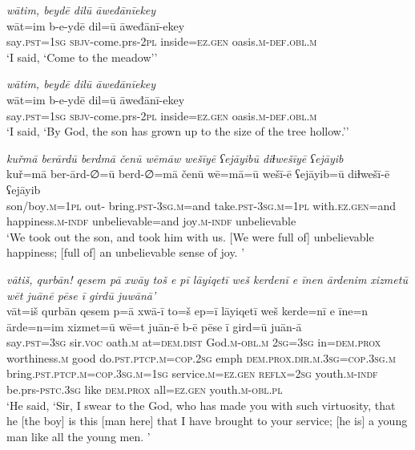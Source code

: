 \ea \label{ZQ.48}
\textit{wātim, beydē dilū āweđānīekey} \\ 
\gll wāt=im b-e-ydē dil=ū āweđānī-ekey \\ 
 say\textsc{.pst}\textsc{=\textsc{1sg}} \textsc{sbjv-}come.prs-\textsc{2pl} inside\textsc{=ez.gen} oasis\textsc{.m}\textsc{-def}\textsc{.obl}\textsc{.m} \\ 
\glt `I said, ‘Come to the meadow’'
\z 
 
\ea \label{ZQ.50}
\textit{wātim, beydē dilū āweđānīekey} \\ 
\gll wāt=im b-e-ydē dil=ū āweđānī-ekey \\ 
 say\textsc{.pst}\textsc{=\textsc{1sg}} \textsc{sbjv-}come.prs-\textsc{2pl} inside\textsc{=ez.gen} oasis\textsc{.m}\textsc{-def}\textsc{.obl}\textsc{.m} \\ 
\glt `I said, ‘By God, the son has grown up to the size of the tree hollow.’'
\z 
 
\ea \label{ZQ.53}
\textit{kuřmā berārdū berdmā čenū wēmāw wešīyē ʕejāyibū diɫwešīyē ʕejāyib} \\ 
\gll kuř=mā ber-ārd-∅=ū berd-∅=mā čenū wē=mā=ū wešī-ē ʕejāyib=ū diɫwešī-ē ʕejāyib \\ 
 son/boy\textsc{.m}\textsc{=\textsc{1pl}} out- bring\textsc{.pst}\textsc{-3sg}\textsc{.m}=and take\textsc{.pst}\textsc{-3sg}\textsc{.m}\textsc{=\textsc{1pl}} with\textsc{.ez.gen}=and happiness\textsc{.m}\textsc{-indf} unbelievable=and joy\textsc{.m}\textsc{-indf} unbelievable \\ 
\glt `We took out the son, and took him with us. [We were full of] unbelievable happiness; [full of] an unbelievable sense of joy. '
\z 
 
\ea \label{ZQ.54}
\textit{vātiš, qurbān! qesem pā xwāy toš e pī lāyiqetī weš kerdenī e īnen ārdenim xizmetū wēt juānē pēse ī girdū juwānā’} \\ 
\gll vāt=iš qurbān qesem p=ā xwā-ī to=š ep=ī lāyiqetī weš kerde=nī e īne=n ārde=n=im xizmet=ū wē=t juān-ē b-ē pēse ī gird=ū juān-ā \\ 
 say\textsc{.pst}\textsc{=3sg} sir.\textsc{voc} oath\textsc{.m} at=\textsc{dem.dist} God\textsc{.m}\textsc{-obl}\textsc{.m} \textsc{2sg}\textsc{=3sg} in=\textsc{dem.prox} worthiness\textsc{.m} good do\textsc{.pst}\textsc{.ptcp}\textsc{.m}\textsc{=cop}\textsc{.\textsc{2sg}} emph \textsc{dem.prox}\textsc{.dir}\textsc{.m}\textsc{.3sg}\textsc{=cop}\textsc{.3sg}\textsc{.m} bring\textsc{.pst}\textsc{.ptcp}\textsc{.m}\textsc{=cop}\textsc{.3sg}\textsc{.m}\textsc{=\textsc{1sg}} service\textsc{.m}\textsc{=ez.gen} \textsc{reflx}\textsc{=\textsc{2sg}} youth\textsc{.m}\textsc{-indf} be.prs\textsc{-pstc}\textsc{.3sg} like \textsc{dem.prox} all\textsc{=ez.gen} youth\textsc{.m}\textsc{-obl}\textsc{.pl} \\ 
\glt `He said, ‘Sir, I swear to the God, who has made you with such virtuosity, that he [the boy] is this [man here] that I have brought to your service; [he is] a young man like all the young men. '
\z 
 
